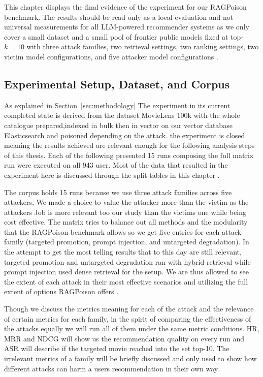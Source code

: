 This chapter displays the final evidence of the experiment for our RAGPoison benchmark. The results should be read only as a local evaluation and not universal measurements for all LLM-powered recommender systems as we only cover a small dataset and a small pool of frontier public models fixed at top-$k=10$ with three attack families, two retrieval settings, two ranking settings, two victim model configurations, and five attacker model configurations \cite{ragpoisonlab_repo,wu2024llmrecsurvey,zhao2024llmrecsystems}.


\subsection{Experimental Setup, Dataset, and Corpus}

As explained in Section~\ref{sec:methodology} The experiment in its current completed state is derived from the dataset MovieLens 100k with the whole catalogue prepared,indexed in bulk then in vector on our vector database Elasticsearch and poisoned depending on the attack. the experiment is closed meaning the results achieved are relevant enough for the following analysis steps of this thesis. Each of the following presented 15 runs composing the full matrix run were executed on all 943 user. Most of the data that resulted in the experiment here is discussed through the split tables in this chapter \cite{ragpoisonlab_repo,harper2015movielens,elastic_docs_es}.

The corpus holds 15 runs because we use three attack families across five attackers, We made a choice to value the attacker more than the victim as the attackers Job is more relevant too our study than the victims one while being cost effective. The matrix tries to balance out all methods and the modularity that the RAGPoison benchmark allows so we get five entries for each attack family (targeted promotion, prompt injection, and untargeted degradation). In the attempt to get the most telling results that to this day are still relevant, targeted promotion and untargeted degradation ran with hybrid retrieval  while prompt injection used dense retrieval for the setup. We are thus allowed to see the extent of each attack in their most effective scenarios and utilizing the full extent of options RAGPoison offers \cite{ragpoisonlab_repo}.

Though we discuss the metrics meaning for each of the attack and the relevance of certain metrics for each family, in the spirit of comparing the effectiveness of the attacks equally we will run all of them under the same metric conditions. HR, MRR and NDCG will show us the recommendation quality on every run and ASR will describe if the targeted movie reached into the set top-10. The irrelevant metrics of a family will be briefly discussed and only used to show how different attacks can harm a users recommendation in their own way \cite{herlocker2004evaluating,wang2013ndcg,ragpoisonlab_repo}

